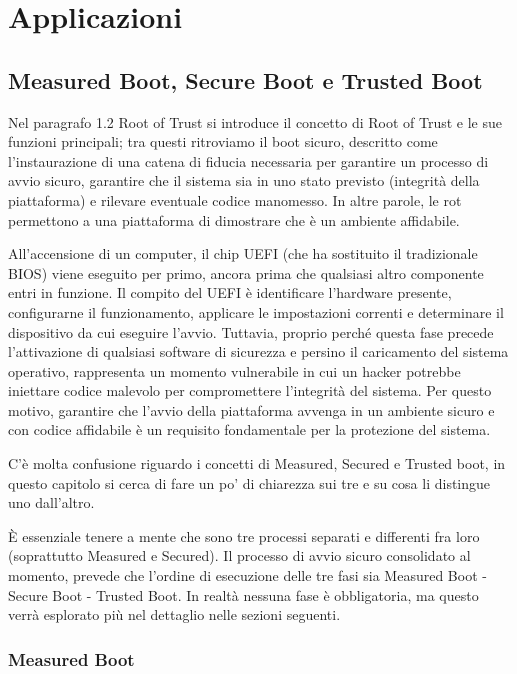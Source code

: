 \chapter{Applicazioni}\label{applicazioni}
\section{Measured Boot, Secure Boot e Trusted Boot}\label{sec:boot_types}

Nel paragrafo 1.2 Root of Trust si introduce il concetto di Root of Trust e le sue funzioni principali; tra questi ritroviamo il boot sicuro, descritto come l’instaurazione di una catena di fiducia necessaria per garantire un processo di avvio sicuro, garantire che il sistema sia in uno stato previsto (integrità della piattaforma) e rilevare eventuale codice manomesso. In altre parole, le \acrshort{rot} permettono a una piattaforma di dimostrare che è un ambiente affidabile.

All'accensione di un computer, il chip UEFI (che ha sostituito il tradizionale BIOS) viene eseguito per primo, ancora prima che qualsiasi altro componente entri in funzione. Il compito del UEFI è identificare l’hardware presente, configurarne il funzionamento, applicare le impostazioni correnti e determinare il dispositivo da cui eseguire l'avvio. Tuttavia, proprio perché questa fase precede l'attivazione di qualsiasi software di sicurezza e persino il caricamento del sistema operativo, rappresenta un momento vulnerabile in cui un hacker potrebbe iniettare codice malevolo per compromettere l'integrità del sistema. Per questo motivo, garantire che l’avvio della piattaforma avvenga in un ambiente sicuro e con codice affidabile è un requisito fondamentale per la protezione del sistema.

C’è molta confusione riguardo i concetti di Measured, Secured e Trusted boot, in questo capitolo si cerca di fare un po’ di chiarezza sui tre e su cosa li distingue uno dall’altro.

È essenziale tenere a mente che sono tre processi separati e differenti fra loro (soprattutto Measured e Secured). Il processo di avvio sicuro consolidato al momento, prevede che l’ordine di esecuzione delle tre fasi sia Measured Boot - Secure Boot - Trusted Boot. In realtà nessuna fase è obbligatoria, ma questo verrà esplorato più nel dettaglio nelle sezioni seguenti.

\subsection{Measured Boot}\label{subsec:measured_boot}

